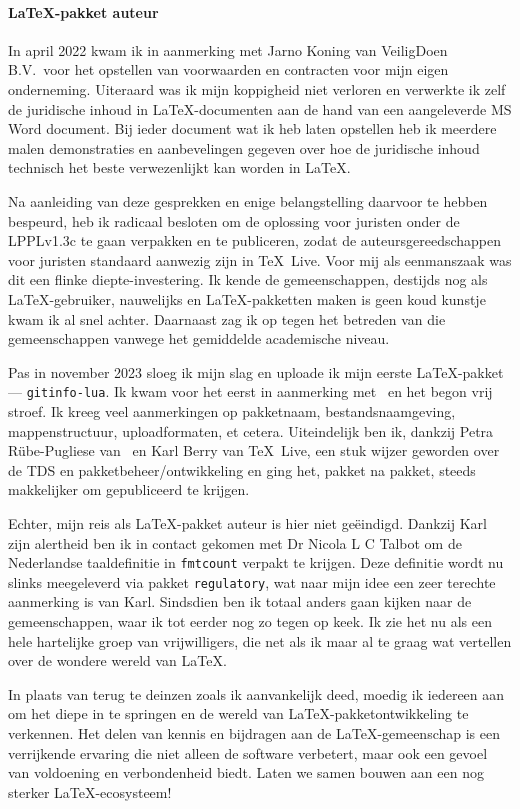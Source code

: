 \documentclass[dutch]{ltugboat}
\begin{document}
    \paragraph{\LaTeX-pakket auteur}
    In april 2022 kwam ik in aanmerking met Jarno Koning van VeiligDoen B.V.\ voor het opstellen van voorwaarden en contracten voor mijn eigen onderneming.
    Uiteraard was ik mijn koppigheid niet verloren en verwerkte ik zelf de juridische inhoud in \LaTeX-documenten aan de hand van een aangeleverde MS Word document.
    Bij ieder document wat ik heb laten opstellen heb ik meerdere malen demonstraties en aanbevelingen gegeven over hoe de juridische inhoud technisch het beste verwezenlijkt kan worden in \LaTeX.

    Na aanleiding van deze gesprekken en enige belangstelling daarvoor te hebben bespeurd, heb ik radicaal besloten om de oplossing voor juristen onder de LPPLv1.3c te gaan verpakken en te publiceren, zodat de auteursgereedschappen voor juristen standaard aanwezig zijn in \TeX\ Live.
    Voor mij als eenmanszaak was dit een flinke diepte-investering.
    Ik kende de gemeenschappen, destijds nog als \LaTeX-gebruiker, nauwelijks en \LaTeX-pakketten maken is geen koud kunstje kwam ik al snel achter.
    Daarnaast zag ik op tegen het betreden van die gemeenschappen vanwege het gemiddelde academische niveau.

    Pas in november 2023 sloeg ik mijn slag en uploade ik mijn eerste \LaTeX-pakket — \texttt{gitinfo-lua}.
    Ik kwam voor het eerst in aanmerking met \CTAN\ en het begon vrij stroef.
    Ik kreeg veel aanmerkingen op pakketnaam, bestandsnaamgeving, mappenstructuur, uploadformaten, et cetera.
    Uiteindelijk ben ik, dankzij Petra Rübe-Pugliese van \CTAN\ en Karl Berry van \TeX\ Live, een stuk wijzer geworden over de TDS en pakketbeheer/ontwikkeling en ging het, pakket na pakket, steeds makkelijker om gepubliceerd te krijgen.

    Echter, mijn reis als \LaTeX-pakket auteur is hier niet geëindigd.
    Dankzij Karl zijn alertheid ben ik in contact gekomen met Dr Nicola L C Talbot om de Nederlandse taaldefinitie in \texttt{fmtcount} verpakt te krijgen.
    Deze definitie wordt nu slinks meegeleverd via pakket \texttt{regulatory}, wat naar mijn idee een zeer terechte aanmerking is van Karl.
    Sindsdien ben ik totaal anders gaan kijken naar de gemeenschappen, waar ik tot eerder nog zo tegen op keek.
    Ik zie het nu als een hele hartelijke groep van vrijwilligers, die net als ik maar al te graag wat vertellen over de wondere wereld van \LaTeX.

    In plaats van terug te deinzen zoals ik aanvankelijk deed, moedig ik iedereen aan om het diepe in te springen en de wereld van \LaTeX-pakketontwikkeling te verkennen.
    Het delen van kennis en bijdragen aan de \LaTeX-gemeenschap is een verrijkende ervaring die niet alleen de software verbetert, maar ook een gevoel van voldoening en verbondenheid biedt.
    Laten we samen bouwen aan een nog sterker \LaTeX-ecosysteem!
\end{document}
